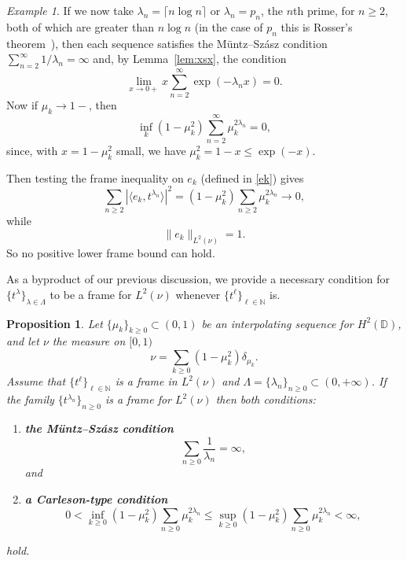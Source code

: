\documentclass[11pt]{amsart}
\newtheorem{proposition}[thm]{Proposition}
\theoremstyle{definition}
\theoremstyle{remark}
\newtheorem{exm}[thm]{Example}
\numberwithin{equation}{section}
\begin{document}
\begin{exm}
If we now take $\lambda_n=\lceil n \log n \rceil$ or $\lambda_n=p_n$, the $n$th prime, for $n \ge 2$, both of which are greater than
$n \log n$ (in the case of $p_n$ this is Rosser's theorem~\cite{rosser}), then
each sequence satisfies the M\"untz--Szász  condition $\sum_{n=2}^\infty 1/\lambda_n = \infty$ and, by Lemma~\ref{lem:xsx}, the condition
\[
\lim_{x \to 0+} x\sum_{n=2}^\infty \exp(-\lambda_n x)=0 .
\]
Now if $\mu_k \to 1-$, then
\[
\inf_k
(1-\mu_k^2)
\sum_{n=2}^\infty
\mu_k^{2\lambda_n}
=0,
\]
since, with $x=1-\mu_k^2$ small, we have
$\mu_k^2 = 1-x \le \exp(-x)$.


Then testing the frame inequality on $e_k$ (defined in \eqref{ek}) gives
\[
\sum_{n\geq 2} |\langle e_k, t^{\lambda_n} \rangle|^2
=
(1-\mu_k^2)\sum_{n\geq 2} \mu_k^{2\lambda_n}
\to 0,
\]
while
\[
\|e_k\|_{L^2(\nu)} = 1.
\]
So no positive lower frame bound can hold.
\end{exm}

As a byproduct of our previous discussion, we provide a necessary condition for $\{t^\lambda\}_{\lambda \in \Lambda}$ to be a frame for $L^2(\nu)$ whenever $\{t^\ell\}_{\ell \in \mathbb{N}}$ is.

\begin{proposition}
Let $\{\mu_k\}_{k\geq 0}\subset(0,1)$ be an interpolating sequence for $H^2(\mathbb{D})$, and let $\nu$ the measure on $[0,1)$
\[
\nu=\sum_{k\ge0}(1-\mu_k^2)\delta_{\mu_k}.
\]
Assume that $\{t^\ell\}_{\ell \in \mathbb{N}}$ is a frame in $L^2(\nu)$ and $\Lambda=\{\lambda_n\}_{n\ge0}\subset (0,+\infty)$. If the family $\{t^{\lambda_n}\}_{n\geq 0}$ is a frame for $L^2(\nu)$ then both conditions:
\begin{enumerate}
\item \textbf{the Müntz--Szász condition}
\[
\sum_{n\ge0}\frac1{\lambda_n}=\infty,
\]
and
\item \textbf{a Carleson-type condition}
\[0<
\inf_{k\ge0}
(1-\mu_k^2)\sum_{n\ge0}\mu_k^{2\lambda_n}
\le
\sup_{k\ge0}
(1-\mu_k^2)\sum_{n\ge0}\mu_k^{2\lambda_n}
<\infty,
\]
\end{enumerate}
hold.
\end{proposition}
\end{document}
